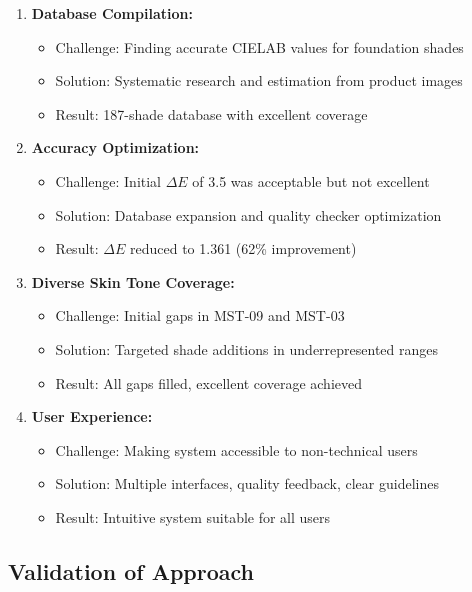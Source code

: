 \begin{enumerate}
    \item \textbf{Database Compilation:}
    \begin{itemize}
        \item Challenge: Finding accurate CIELAB values for foundation shades
        \item Solution: Systematic research and estimation from product images
        \item Result: 187-shade database with excellent coverage
    \end{itemize}
    
    \item \textbf{Accuracy Optimization:}
    \begin{itemize}
        \item Challenge: Initial $\Delta E$ of 3.5 was acceptable but not excellent
        \item Solution: Database expansion and quality checker optimization
        \item Result: $\Delta E$ reduced to 1.361 (62\% improvement)
    \end{itemize}
    
    \item \textbf{Diverse Skin Tone Coverage:}
    \begin{itemize}
        \item Challenge: Initial gaps in MST-09 and MST-03
        \item Solution: Targeted shade additions in underrepresented ranges
        \item Result: All gaps filled, excellent coverage achieved
    \end{itemize}
    
    \item \textbf{User Experience:}
    \begin{itemize}
        \item Challenge: Making system accessible to non-technical users
        \item Solution: Multiple interfaces, quality feedback, clear guidelines
        \item Result: Intuitive system suitable for all users
    \end{itemize}
\end{enumerate}

\subsection{Validation of Approach}

